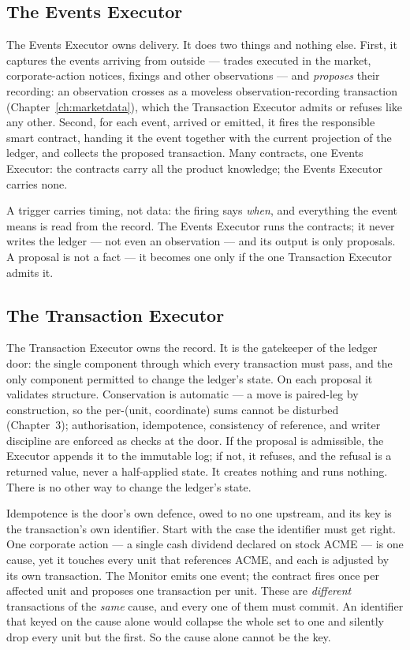 \subsection{The Events Executor}

The Events Executor owns delivery. It does two things and nothing else. First,
it captures the events arriving from outside --- trades executed in the market,
corporate-action notices, fixings and other observations --- and \emph{proposes}
their recording: an observation crosses as a moveless observation-recording
transaction (Chapter~\ref{ch:marketdata}), which the Transaction Executor admits
or refuses like any other. Second, for each event, arrived or emitted, it fires the
responsible smart contract, handing it the event together with the current
projection of the ledger, and collects the proposed transaction. Many
contracts, one Events Executor: the contracts carry all the product knowledge;
the Events Executor carries none.

A trigger carries timing, not data: the firing says \emph{when}, and everything
the event means is read from the record. The Events Executor runs the
contracts; it never writes the ledger --- not even an observation --- and its
output is only proposals. A proposal is not a fact --- it becomes one only if the
one Transaction Executor admits it.

\subsection{The Transaction Executor}

The Transaction Executor owns the record. It is the gatekeeper of the ledger
door: the single component through which every transaction must pass, and the
only component permitted to change the ledger's state. On each proposal it
validates structure. Conservation is automatic --- a move is paired-leg by
construction, so the per-(unit, coordinate) sums cannot be disturbed
(Chapter~3); authorisation, idempotence, consistency of reference, and writer
discipline are enforced as checks at the door. If the proposal is admissible,
the Executor appends it to the immutable log; if not, it refuses, and the
refusal is a returned value, never a half-applied state. It creates nothing and
runs nothing. There is no other way to change the ledger's state.

Idempotence is the door's own defence, owed to no one upstream, and its key is the
transaction's own identifier. Start with the case the identifier must get right. One
corporate action --- a single cash dividend declared on stock ACME --- is one cause,
yet it touches every unit that references ACME, and each is adjusted by its own
transaction. The Monitor emits one event; the contract fires once per affected unit
and proposes one transaction per unit. These are \emph{different} transactions of the
\emph{same} cause, and every one of them must commit. An identifier that keyed on the
cause alone would collapse the whole set to one and silently drop every unit but the
first. So the cause alone cannot be the key.

